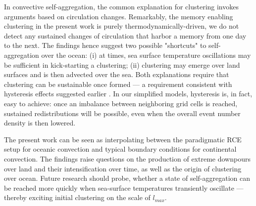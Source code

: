 \documentclass[draft,linenumbers]{agujournal2019}
\begin{document}
In convective self-aggregation, the common explanation for clustering invokes arguments based on circulation changes.
Remarkably, the memory enabling clustering in the present work is purely thermodynamically-driven, we do not detect any sustained changes of circulation that harbor a memory from one day to the next.
The findings hence suggest two possible "shortcuts" to self-aggregation over the ocean: 
(i) at times, sea surface temperature oscillations may be sufficient in kick-starting a clustering;
(ii) clustering may emerge over land surfaces and is then advected over the sea.
Both explanations require that clustering can be sustainable once formed --- a requirement consistent with hysteresis effects suggested earlier \cite{muller2015favors}.
In our simplified models, hysteresis is, in fact, easy to achieve: once an imbalance between neighboring grid cells is reached, sustained redistributions will be possible, even when the overall event number density is then lowered.

The present work can be seen as interpolating between the paradigmatic RCE setup for oceanic convection and typical boundary conditions for continental convection. 
The findings raise questions on the production of extreme downpours over land and their intensification over time, as well as the origin of clustering over ocean.
Future research should probe, whether a state of self-aggregation can be reached more quickly when sea-surface temperatures transiently oscillate --- thereby exciting initial clustering on the scale of $l_{max}$.

\newpage
\clearpage
\end{document}
